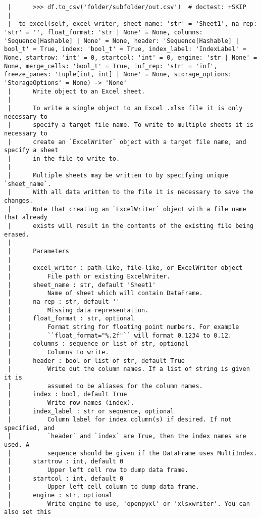 \documentclass[
  letterpaper,
  DIV=11,
  numbers=noendperiod]{scrreprt}
\begin{document}
\begin{verbatim}
 |      >>> df.to_csv('folder/subfolder/out.csv')  # doctest: +SKIP
 |  
 |  to_excel(self, excel_writer, sheet_name: 'str' = 'Sheet1', na_rep: 'str' = '', float_format: 'str | None' = None, columns: 'Sequence[Hashable] | None' = None, header: 'Sequence[Hashable] | bool_t' = True, index: 'bool_t' = True, index_label: 'IndexLabel' = None, startrow: 'int' = 0, startcol: 'int' = 0, engine: 'str | None' = None, merge_cells: 'bool_t' = True, inf_rep: 'str' = 'inf', freeze_panes: 'tuple[int, int] | None' = None, storage_options: 'StorageOptions' = None) -> 'None'
 |      Write object to an Excel sheet.
 |      
 |      To write a single object to an Excel .xlsx file it is only necessary to
 |      specify a target file name. To write to multiple sheets it is necessary to
 |      create an `ExcelWriter` object with a target file name, and specify a sheet
 |      in the file to write to.
 |      
 |      Multiple sheets may be written to by specifying unique `sheet_name`.
 |      With all data written to the file it is necessary to save the changes.
 |      Note that creating an `ExcelWriter` object with a file name that already
 |      exists will result in the contents of the existing file being erased.
 |      
 |      Parameters
 |      ----------
 |      excel_writer : path-like, file-like, or ExcelWriter object
 |          File path or existing ExcelWriter.
 |      sheet_name : str, default 'Sheet1'
 |          Name of sheet which will contain DataFrame.
 |      na_rep : str, default ''
 |          Missing data representation.
 |      float_format : str, optional
 |          Format string for floating point numbers. For example
 |          ``float_format="%.2f"`` will format 0.1234 to 0.12.
 |      columns : sequence or list of str, optional
 |          Columns to write.
 |      header : bool or list of str, default True
 |          Write out the column names. If a list of string is given it is
 |          assumed to be aliases for the column names.
 |      index : bool, default True
 |          Write row names (index).
 |      index_label : str or sequence, optional
 |          Column label for index column(s) if desired. If not specified, and
 |          `header` and `index` are True, then the index names are used. A
 |          sequence should be given if the DataFrame uses MultiIndex.
 |      startrow : int, default 0
 |          Upper left cell row to dump data frame.
 |      startcol : int, default 0
 |          Upper left cell column to dump data frame.
 |      engine : str, optional
 |          Write engine to use, 'openpyxl' or 'xlsxwriter'. You can also set this

\end{verbatim}
\end{document}
